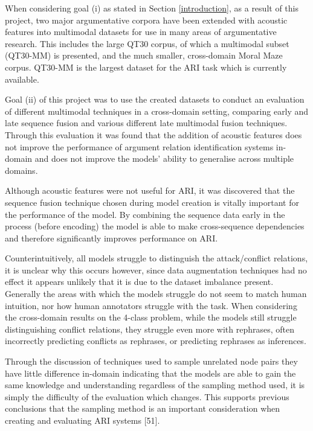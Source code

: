 \documentclass[twocolumn]{article}
\begin{document}
When considering goal (i) as stated in Section \ref{introduction}, as a
result of this project, two major argumentative corpora have been
extended with acoustic features into multimodal datasets for use in many
areas of argumentative research. This includes the large QT30 corpus, of
which a multimodal subset (QT30-MM) is presented, and the much smaller,
cross-domain Moral Maze corpus. QT30-MM is the largest dataset for the ARI task which is currently available.

Goal (ii) of this project was to use the created datasets to conduct an
evaluation of different multimodal techniques in a cross-domain setting,
comparing early and late sequence fusion and various different late
multimodal fusion techniques. Through this evaluation it was found that
the addition of acoustic features does not improve the performance of
argument relation identification systems in-domain and does not improve
the models' ability to generalise across multiple domains.

Although acoustic features were not useful for ARI, it was discovered
that the sequence fusion technique chosen during model creation is
vitally important for the performance of the model. By combining the
sequence data early in the process (before encoding) the model is able
to make cross-sequence dependencies and therefore significantly improves
performance on ARI.

Counterintuitively, all models struggle to distinguish the
attack/conflict relations, it is unclear why this occurs however, since
data augmentation techniques had no effect it appears unlikely that it
is due to the dataset imbalance present. Generally the areas with which
the models struggle do not seem to match human intuition, nor how human
annotators struggle with the task. When considering the cross-domain
results on the 4-class problem, while the models still struggle
distinguishing conflict relations, they struggle even more with
rephrases, often incorrectly predicting conflicts as rephrases, or
predicting rephrases as inferences.

Through the discussion of techniques used to sample unrelated node pairs
they have little difference in-domain indicating that the models are
able to gain the same knowledge and understanding regardless of the
sampling method used, it is simply the difficulty of the evaluation
which changes. This supports previous conclusions that the sampling
method is an important consideration when creating and evaluating ARI
systems {[}51{]}.
\end{document}
